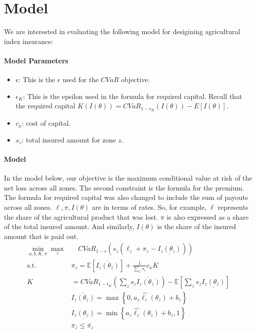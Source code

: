 \documentclass[11pt]{article}
\begin{document}
\section{Model}
We are interested in evaluating the following model for desigining agricultural index insurance:

  \paragraph*{Model Parameters}
  \begin{itemize}
      \item $\epsilon$: This is the $\epsilon$ used for the $CVaR$ objective. 
      \item $\epsilon_K$: This is the epsilon used in the formula for required capital. Recall that the required capital $K(I(\theta)) = CVaR_{1-\epsilon_K}(I(\theta)) - E[I(\theta)]$. 
      \item $c_{\kappa}$: cost of capital. 
      \item $s_z$: total insured amount for zone $z$.
  \end{itemize}

  \paragraph*{Model}
  In the model below, our objective is the maximum conditional value at risk of the net loss across all zones. The second constraint is the formula for the premium. The formula for required capital was also changed to include the sum of payouts across all zones. $\ell, \pi, I(\theta)$ are in terms of rates. So, for example, $\ell$ represents the share of the agricultural product that was lost. $\pi$ is also expressed as a share of the total insured amount. And similarly, $I(\theta)$ is the share of the insured amount that is paid out.
  \begin{align}
    \min_{a,b,K,\pi} \max_z &\quad CVaR_{1-\epsilon}\left (s_z \left (\ell_z  + \pi_z - \underline{I_z(\theta_z)}\right ) \right )\\
    \text{s.t.   } & \pi_z  = \mathbb{E}\left [ \overline{I_z(\theta_z)} \right ] + \frac{1}{\sum_z s_z} c_{\kappa} K \\
    K &= CVaR_{1-\epsilon_K} \left( \sum_z s_z\overline{I_z(\theta_z)} \right ) - \mathbb{E}\left [ \sum_z s_z\underline{I_z(\theta_z)} \right ]\\
    &\overline{I_z(\theta_z)} = \max \left \{0,a_z\hat{\ell_z}(\theta_z) + b_z \right \}\\
    &\underline{I_z(\theta_z)} = \min \left \{a_z\hat{\ell_z}(\theta_z)+b_z,1 \right \}\\
    &\pi_z \leq \overline{\pi_z}
  \end{align}
\end{document}
